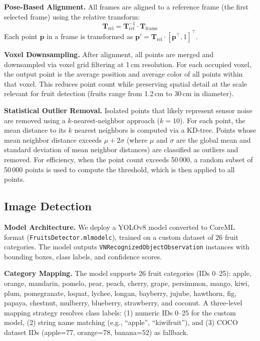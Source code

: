 \documentclass[article,final]{iclr2024_conference}
\begin{document}
\textbf{Pose-Based Alignment.}
All frames are aligned to a reference frame (the first selected frame) using the relative transform:
\begin{equation}
\mathbf{T}_{\text{rel}} = \mathbf{T}_{\text{ref}}^{-1} \cdot \mathbf{T}_{\text{frame}}
\end{equation}
Each point $\mathbf{p}$ in a frame is transformed as $\mathbf{p}' = \mathbf{T}_{\text{rel}} \cdot [\mathbf{p}^\top, 1]^\top$.

\textbf{Voxel Downsampling.}
After alignment, all points are merged and downsampled via voxel grid filtering at 1\,cm resolution. For each occupied voxel, the output point is the average position and average color of all points within that voxel. This reduces point count while preserving spatial detail at the scale relevant for fruit detection (fruits range from 1.2\,cm to 30\,cm in diameter).

\textbf{Statistical Outlier Removal.}
Isolated points that likely represent sensor noise are removed using a $k$-nearest-neighbor approach ($k=10$). For each point, the mean distance to its $k$ nearest neighbors is computed via a KD-tree. Points whose mean neighbor distance exceeds $\mu + 2\sigma$ (where $\mu$ and $\sigma$ are the global mean and standard deviation of mean neighbor distances) are classified as outliers and removed. For efficiency, when the point count exceeds 50\,000, a random subset of 50\,000 points is used to compute the threshold, which is then applied to all points.

\subsection{Image Detection}
\label{sec:detection}

\textbf{Model Architecture.}
We deploy a YOLOv8 model converted to CoreML format (\texttt{FruitsDetector.mlmodelc}), trained on a custom dataset of 26 fruit categories. The model outputs \texttt{VNRecognizedObjectObservation} instances with bounding boxes, class labels, and confidence scores.

\textbf{Category Mapping.}
The model supports 26 fruit categories (IDs 0--25): apple, orange, mandarin, pomelo, pear, peach, cherry, grape, persimmon, mango, kiwi, plum, pomegranate, loquat, lychee, longan, bayberry, jujube, hawthorn, fig, papaya, chestnut, mulberry, blueberry, strawberry, and coconut. A three-level mapping strategy resolves class labels: (1) numeric IDs 0--25 for the custom model, (2) string name matching (e.g., ``apple'', ``kiwifruit''), and (3) COCO dataset IDs (apple=77, orange=78, banana=52) as fallback.
\end{document}
